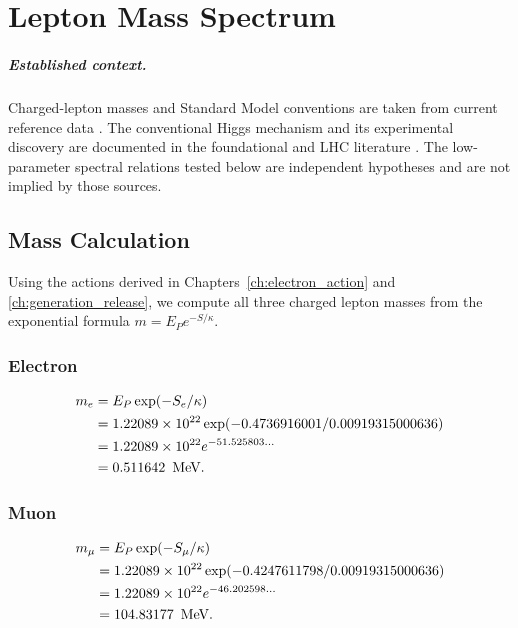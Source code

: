 \chapter{Lepton Mass Spectrum}
\label{ch:lepton_spectrum}


\paragraph{Established context.}
Charged-lepton masses and Standard Model conventions are taken from current
reference data \cite{PDG2024}.  The conventional Higgs mechanism and its
experimental discovery are documented in the foundational and LHC literature
\cite{EnglertBrout1964,Higgs1964,GHK1964,ATLAS2012Higgs,CMS2012Higgs}.
The low-parameter spectral relations tested below are independent hypotheses and
are not implied by those sources.

\section{Mass Calculation}

Using the actions derived in Chapters~\ref{ch:electron_action} and
\ref{ch:generation_release}, we compute all three charged lepton masses
from the exponential formula \(m = E_P e^{-S/\kappa}\).

\subsection{Electron}

\[
\begin{aligned}
m_e &= E_P \exp(-S_e/\kappa) \\
    &= 1.22089 \times 10^{22} \exp(-0.4736916001 / 0.00919315000636) \\
    &= 1.22089 \times 10^{22} e^{-51.525803\ldots} \\
    &= 0.511642\ \,\text{MeV}.
\end{aligned}
\]

\subsection{Muon}

\[
\begin{aligned}
m_\mu &= E_P \exp(-S_\mu/\kappa) \\
      &= 1.22089 \times 10^{22} \exp(-0.4247611798 / 0.00919315000636) \\
      &= 1.22089 \times 10^{22} e^{-46.202598\ldots} \\
      &= 104.83177\ \,\text{MeV}.
\end{aligned}
\]

